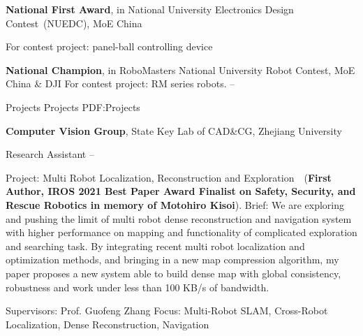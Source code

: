 \documentclass[letterpaper,MMMyyyy,nonstopmode]{simpleresumecv}
\begin{document}
\begin{Body}
\Gap
\Entry
\textbf{National First Award},
in National University Electronics Design Contest~(NUEDC), 
MoE China

\BulletItem
For contest project: panel-ball controlling device
\hfill
{}

\Gap
\Entry
\textbf{National Champion},
in RoboMasters National University Robot Contest,
MoE China \& DJI
\BulletItem
For contest project: RM series robots.\cite{yijie2016}
\hfill
{} --







\Section
{Projects}
{Projects}
{PDF:Projects}

\Entry
{\textbf{Computer Vision Group}},
State Key Lab of CAD\&CG, Zhejiang University

\BulletItem
Research Assistant
\hfill
{} --
\begin{Detail}
\SubBulletItem
Project:
Multi Robot Localization, Reconstruction and Exploration~\cite{xiangyu2021coxgraph}~(\textbf{First Author, IROS 2021 Best Paper Award Finalist on Safety, Security, and Rescue Robotics in memory of Motohiro Kisoi}).
\SubBulletItem
Brief:
We are exploring and pushing the limit of multi robot dense reconstruction and navigation system with higher performance on mapping and functionality of complicated exploration and searching task.
By integrating recent multi robot localization and optimization methods, and bringing in a new map compression algorithm, my paper proposes a new system able to build dense map with global consistency, robustness and work under less than 100 KB/s of bandwidth.

\SubBulletItem
Supervisors:
Prof. Guofeng Zhang
\SubBulletItem
Focus:
Multi-Robot SLAM, Cross-Robot Localization, Dense Reconstruction, Navigation
\end{Detail}


\end{Body}
\end{document}
